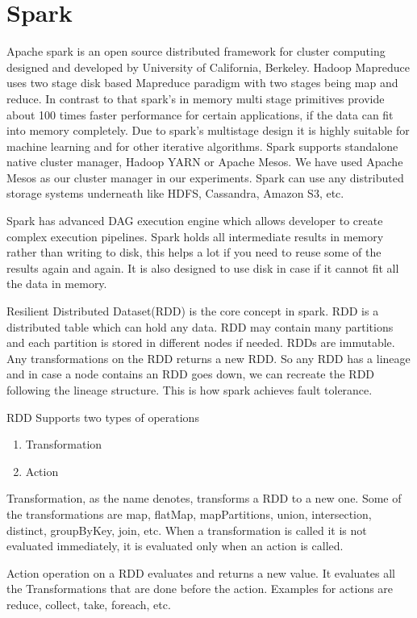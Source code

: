 \medskip

\section{Spark}
Apache spark is an open source distributed framework for cluster
computing designed and developed by University of California,
Berkeley. Hadoop Mapreduce uses two stage disk based Mapreduce
paradigm with two stages being map and reduce. In contrast to that
spark's in memory multi stage primitives provide about 100 times
faster performance for certain applications, if the data can fit into
memory completely. Due to spark's multistage design it is highly
suitable for machine learning and for other iterative algorithms.
Spark supports standalone native cluster manager, Hadoop YARN or
Apache Mesos. We have used Apache Mesos as our cluster manager in our
experiments. Spark can use any distributed storage systems underneath
like HDFS, Cassandra, Amazon S3, etc.

Spark has advanced DAG execution engine which allows developer to
create complex execution pipelines. Spark holds all intermediate
results in memory rather than writing to disk, this helps a lot if you
need to reuse some of the results again and again. It is also designed
to use disk in case if it cannot fit all the data in memory.

Resilient Distributed Dataset(RDD) is the core concept in spark. RDD
is a distributed table which can hold any data. RDD may contain many
partitions and each partition is stored in different nodes if needed.
RDDs are immutable. Any transformations on the RDD returns a new
RDD. So any RDD has a lineage and in case a node contains an RDD goes
down, we can recreate the RDD following the lineage structure. This is
how spark achieves fault tolerance.

RDD Supports two types of operations
\begin{enumerate}
\item Transformation
\item Action
\end{enumerate}

Transformation, as the name denotes, transforms a RDD to a new
one. Some of the transformations are map, flatMap, mapPartitions,
union, intersection, distinct, groupByKey, join, etc. When a
transformation is called it is not evaluated immediately, it is
evaluated only when an action is called.

Action operation on a RDD evaluates and returns a new value. It
evaluates all the Transformations that are done before the
action. Examples for actions are reduce, collect, take, foreach, etc.

